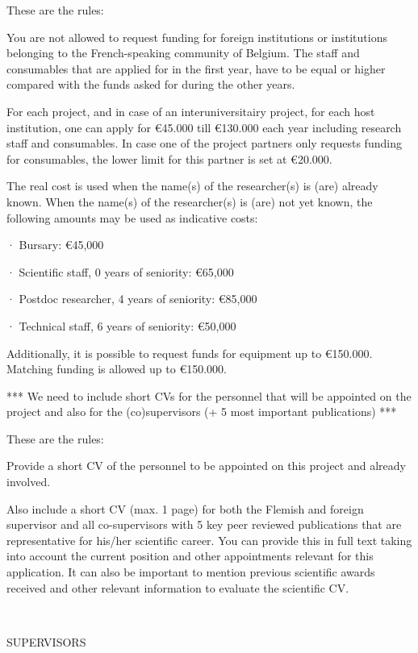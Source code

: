 \documentclass[11pt,dvipsnames,usenames,a4paper]{article}
\begin{document}
{\color{Gray}These are the rules:

You are not allowed to request funding for foreign institutions or institutions belonging to the French-speaking community of Belgium. The staff and consumables that are applied for in the first year, have to be equal or higher compared with the funds asked for during the other years. 

For each project, and in case of an interuniversitairy project, for each host institution, one can apply for €45.000 till €130.000 each year including research staff and consumables. In case one of the project partners only requests funding for consumables, the lower limit for this partner is set at €20.000. 

The real cost is used when the name(s) of the researcher(s) is (are) already known. When the name(s) of the researcher(s) is (are) not yet known, the following amounts may be used as indicative costs:

·         Bursary: €45,000

·         Scientific staff, 0 years of seniority: €65,000

·         Postdoc researcher, 4 years of seniority: €85,000

·         Technical staff, 6 years of seniority: €50,000


Additionally, it is possible to request funds for equipment up to €150.000. Matching funding is allowed up to €150.000.
}


*** We need to include short CVs for the personnel that will be appointed on the project and also for the (co)supervisors (+ 5 most important publications)  ***

{\color{Gray}
These are the rules:

Provide a short CV of the personnel to be appointed on this project and already involved. 

Also include a short CV (max. 1 page) for both the Flemish and foreign supervisor and all co-supervisors with 5 key peer reviewed publications that are representative for his/her scientific career. You can provide this in full text taking into account the current position and other appointments relevant for this application. It can also be important to mention previous scientific awards received and other relevant information to evaluate the scientific CV.}\\

\begin{shaded}\centering SUPERVISORS \end{shaded}
\end{document}

